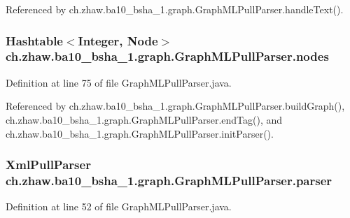 Referenced by ch.zhaw.ba10\_\-bsha\_\-1.graph.GraphMLPullParser.handleText().\hypertarget{classch_1_1zhaw_1_1ba10__bsha__1_1_1graph_1_1GraphMLPullParser_acf2b3dbec13a253bc3667292157150c4}{
\subsubsection[{nodes}]{\setlength{\rightskip}{0pt plus 5cm}Hashtable$<$Integer, {\bf Node}$>$ {\bf ch.zhaw.ba10\_\-bsha\_\-1.graph.GraphMLPullParser.nodes}}}
\label{classch_1_1zhaw_1_1ba10__bsha__1_1_1graph_1_1GraphMLPullParser_acf2b3dbec13a253bc3667292157150c4}


Definition at line 75 of file GraphMLPullParser.java.

Referenced by ch.zhaw.ba10\_\-bsha\_\-1.graph.GraphMLPullParser.buildGraph(), ch.zhaw.ba10\_\-bsha\_\-1.graph.GraphMLPullParser.endTag(), and ch.zhaw.ba10\_\-bsha\_\-1.graph.GraphMLPullParser.initParser().\hypertarget{classch_1_1zhaw_1_1ba10__bsha__1_1_1graph_1_1GraphMLPullParser_a71778cb195f68c6f07c7bc50697f8ec1}{
\subsubsection[{parser}]{\setlength{\rightskip}{0pt plus 5cm}XmlPullParser {\bf ch.zhaw.ba10\_\-bsha\_\-1.graph.GraphMLPullParser.parser}}}
\label{classch_1_1zhaw_1_1ba10__bsha__1_1_1graph_1_1GraphMLPullParser_a71778cb195f68c6f07c7bc50697f8ec1}


Definition at line 52 of file GraphMLPullParser.java.

